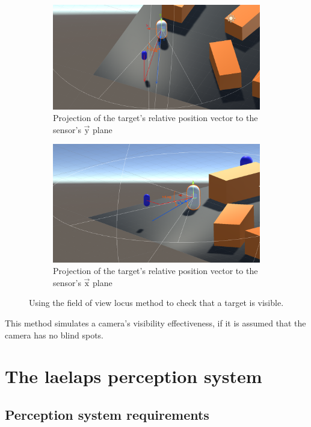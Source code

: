 \documentclass{article}
\begin{document}
\begin{figure}
\centering
\begin{subfigure}[b]{1\textwidth}
   \centering
   \includegraphics[width=0.8\linewidth]{FOV(17).png}
   \caption{Projection of the target's relative position vector to the sensor's $\overrightarrow{\text{y}}$ plane}
\end{subfigure}
\begin{subfigure}[b]{1\textwidth}
   \centering
   \includegraphics[width=0.8\linewidth]{FOV(18).png}
   \caption{Projection of the target's relative position vector to the sensor's $\overrightarrow{\text{x}}$ plane}
\end{subfigure}
\caption[]{Using the field of view locus method to check that a target is visible.}
\end{figure}

This method simulates a camera's visibility effectiveness, if it is assumed that the camera has no blind spots. 

\clearpage


\section{The laelaps perception system}

\subsection{Perception system requirements}
\end{document}
